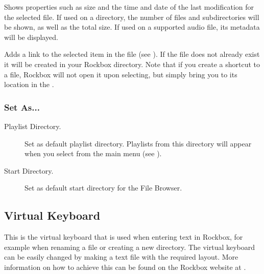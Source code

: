 \begin{description}
  Shows properties such as size and the time and date of the last modification
  for the selected file. If used on a directory, the number of files and
  subdirectories will be shown, as well as the total size. If used on a supported
  audio file, its metadata will be displayed.
\item [Add to Shortcuts.]
  Adds a link to the selected item in the  file
  (see ).
  If the file does not already exist it will be created in your Rockbox directory.
  Note that if you create a shortcut to a file, Rockbox will not open it upon
  selecting, but simply bring you to its location in the .
\end{description}

\subsubsection{\label{ref:SetAs}Set As...}
\begin{description}
  \item [Playlist Directory.]
     Set as default playlist directory. Playlists from this directory will appear
     when you select  from the main menu
     (see ).
  \item [Start Directory.]
   Set as default start directory for the File Browser.
\end{description}

\subsection{\label{sec:virtual_keyboard}Virtual Keyboard}
This is the virtual keyboard that is used when entering text in Rockbox, for
example when renaming a file or creating a new directory.
The virtual keyboard can be easily changed by making a text file
with the required layout. More information on how to achieve this can be found
on the Rockbox website at .

